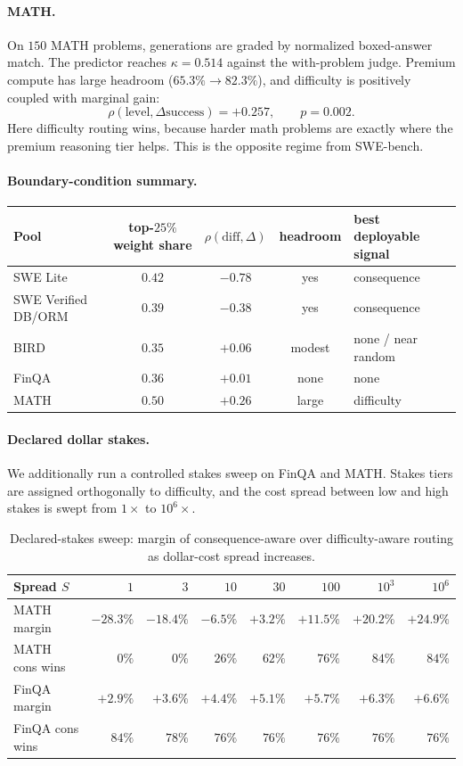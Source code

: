 \documentclass{article}
\begin{document}
\paragraph{MATH.}
On $150$ MATH problems, generations are graded by normalized
boxed-answer match. The predictor reaches $\kappa=0.514$ against the
with-problem judge. Premium compute has large headroom
($65.3\%\to82.3\%$), and difficulty is positively coupled with
marginal gain:
\[
\rho(\mathrm{level},\Delta\mathrm{success})=+0.257,
\qquad p=0.002.
\]
Here difficulty routing wins, because harder math problems are exactly
where the premium reasoning tier helps. This is the opposite regime
from SWE-bench.

\paragraph{Boundary-condition summary.}
\begin{center}
\small
\begin{tabular}{lcccl}
\toprule
Pool & top-$25\%$ weight share & $\rho(\mathrm{diff},\Delta)$ & headroom & best deployable signal \\
\midrule
SWE Lite & $0.42$ & $-0.78$ & yes & consequence \\
SWE Verified DB/ORM & $0.39$ & $-0.38$ & yes & consequence \\
BIRD & $0.35$ & $+0.06$ & modest & none / near random \\
FinQA & $0.36$ & $+0.01$ & none & none \\
MATH & $0.50$ & $+0.26$ & large & difficulty \\
\bottomrule
\end{tabular}
\end{center}

\paragraph{Declared dollar stakes.}
We additionally run a controlled stakes sweep on FinQA and MATH. Stakes
tiers are assigned orthogonally to difficulty, and the cost spread
between low and high stakes is swept from $1\times$ to $10^6\times$.

\begin{table}[h]
\centering
\caption{Declared-stakes sweep: margin of consequence-aware over
difficulty-aware routing as dollar-cost spread increases.}
\label{tab:stakescross}
\small
\begin{tabular}{lrrrrrrr}
\toprule
Spread $S$ & $1$ & $3$ & $10$ & $30$ & $100$ & $10^3$ & $10^6$ \\
\midrule
MATH margin & $-28.3\%$ & $-18.4\%$ & $-6.5\%$ & $+3.2\%$ & $+11.5\%$ & $+20.2\%$ & $+24.9\%$ \\
MATH cons wins & $0\%$ & $0\%$ & $26\%$ & $62\%$ & $76\%$ & $84\%$ & $84\%$ \\
FinQA margin & $+2.9\%$ & $+3.6\%$ & $+4.4\%$ & $+5.1\%$ & $+5.7\%$ & $+6.3\%$ & $+6.6\%$ \\
FinQA cons wins & $84\%$ & $78\%$ & $76\%$ & $76\%$ & $76\%$ & $76\%$ & $76\%$ \\
\bottomrule
\end{tabular}
\end{table}
\end{document}
